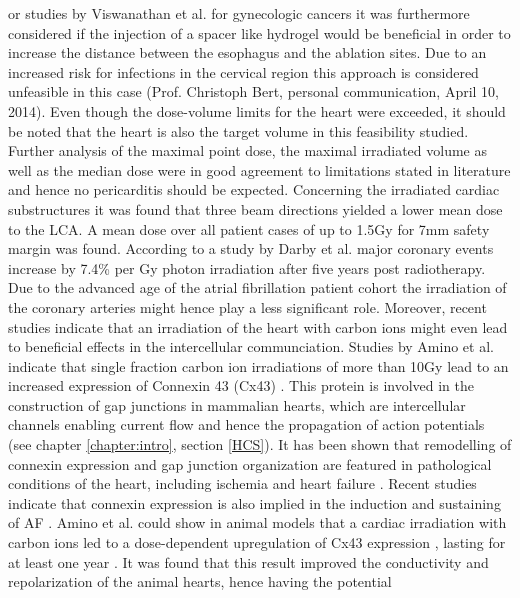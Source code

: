 or studies by Viswanathan et al. \cite{Vis13} for gynecologic cancers it was furthermore considered if the 
injection of a spacer like hydrogel would be beneficial in order to increase the distance between the esophagus and the ablation sites. 
Due to an increased risk for infections in the cervical region this approach is considered unfeasible in this case (Prof. Christoph Bert, 
personal communication, April 10, 2014).\newline
\newline
Even though the dose-volume limits for the heart were exceeded, it should be noted that the heart is also the target volume in this 
feasibility studied. Further analysis of the maximal point dose, the maximal irradiated volume as well as the median 
dose were in good agreement to limitations stated in literature \cite{Gag10, Mar98, Wei08, Han93} and hence no pericarditis 
should be expected. Concerning the irradiated cardiac substructures it was found that three beam directions yielded a lower mean dose 
to the LCA. A mean dose over all patient cases of up to 1.5Gy for 7mm safety margin was found. According to a study by Darby et al. \cite{Dar13} 
major coronary events increase by 7.4\% per Gy photon irradiation after five years post radiotherapy. Due to the advanced age of the 
atrial fibrillation patient cohort the irradiation of the coronary arteries might hence play a less significant role. 
Moreover, recent studies indicate that an irradiation of the heart with carbon ions might even lead to beneficial effects in the 
intercellular communciation. 
Studies by Amino et al. indicate that single fraction carbon ion irradiations of more than 10Gy lead to an increased expression of Connexin 43 
(Cx43) \cite{Ami06, Ami10}. This protein is involved in the construction of gap junctions in mammalian hearts, which are intercellular 
channels enabling current flow and hence the propagation of action potentials (see chapter \ref{chapter:intro}, section \ref{HCS}). 
It has been shown that remodelling of connexin expression and gap junction organization are featured in pathological conditions of the heart, 
including ischemia and heart failure \cite{Sev04, Sev08}. Recent studies indicate that connexin expression is also 
implied in the induction and sustaining of AF \cite{Kan04, Pol01, Yeh01, Bik11}. Amino et al. could show in animal models 
that a cardiac irradiation with carbon ions led to a dose-dependent upregulation of Cx43 expression \cite{Ami06}, lasting for at least one 
year \cite{Ami10}. It was found that this result improved the conductivity and repolarization of the animal hearts, hence having the potential 
